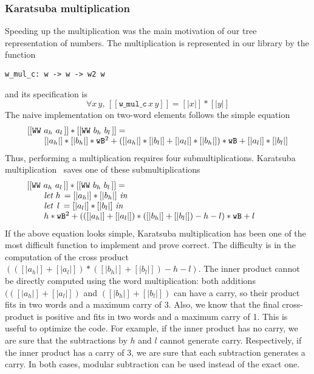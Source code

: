 \subsubsection{Karatsuba multiplication}
Speeding up the multiplication was the main motivation of our 
tree representation of numbers. The multiplication is represented in our library
by the function
\begin{verbatim}
w_mul_c: w -> w -> w2 w
\end{verbatim}
and its specification is
$$\forall x\, y,\, [[\texttt{w\_mul\_c}\, x\, y]] = [|x|] * [|y|]$$
The naive implementation on two-word elements follows the simple equation
$$\begin{array}{l}
[[\texttt{WW}\,\,a_h\,\,a_l\,]] * [[\texttt{WW}\,\,b_h\,\,b_l\,]] =\\
\hskip20pt [|{a_h}|] * [|{b_h}|] * {\texttt{wB}} ^ 2 +  ([|{a_h}|] * [|{b_l}|] + [|{a_l}|] * [|{b_h}|]) * {\texttt{wB}} + [|{a_l}|] * [|{b_l}|]
\end{array}
$$
Thus, performing a multiplication requires four submultiplications.
Karatsuba multiplication~\cite{Karat} saves one of these submultiplications
$$\begin{array}{l}
[[\texttt{WW}\,\,a_h\,\,a_l\,]] * [[\texttt{WW}\,\,b_h\,\,b_l\,]] = \\
\hskip20pt \textit{let}\,\, {h}\, = [|{a_h}|] * [|{b_h}|]\,\, \textit{in}\\
\hskip20pt \textit{let}\,\,\,  {l}\, = [|{a_l}|] * [|{b_l}|]\,\, \textit{in}\\
\hskip20pt {h} * {\texttt{wB}}^2 + (([|{a_h}|] + [|{a_l}|]) * ([|{b_h}|] + [|{b_l}|]) - {h} - {l}) * {\texttt{wB}} + {l} \qquad\qquad
\end{array}
$$
If the above equation looks simple,  Karatsuba multiplication has been one of the most difficult function 
to implement and prove correct.
The difficulty is in the computation of the cross
product $(([|{a_h}|] + [|{a_l}|]) * ([|{b_h}|] + [|{b_l}|]) - {h} - {l})$. 
The inner product cannot be directly computed using the word multiplication: 
both additions $(([|{a_h}|] + [|{a_l}|])$ and $([|{b_h}|] + [|{b_l}|])$ can have a carry, 
so their product fits in two words and a maximum carry of 3.
Also, we know that the final cross-product is positive and fits in
two words and a maximum carry of 1. This is useful to optimize the code. For example, 
if the inner product has no carry, we are sure that the subtractions by $h$ and $l$ cannot 
generate carry. Respectively, if the inner product has a carry of 3,  we are sure that each 
subtraction generates a carry. In both cases, modular subtraction can be used instead of
the exact one. 

